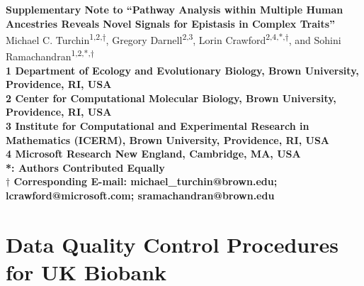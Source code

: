 \documentclass[10pt]{article}
\begin{document}
\begin{flushleft}
{\Large{\textbf{Supplementary Note to ``Pathway Analysis within Multiple Human Ancestries Reveals Novel Signals for Epistasis in Complex Traits''}}}
\newline
\\
Michael C. Turchin\textsuperscript{1,2,$\dagger$}, Gregory Darnell\textsuperscript{2,3}, Lorin Crawford\textsuperscript{2,4,*,$\dagger$}, and Sohini Ramachandran\textsuperscript{1,2,*,$\dagger$} 
\\
\bigskip
\bf{1} Department of Ecology and Evolutionary Biology, Brown University, Providence, RI, USA
\\
\bf{2} Center for Computational Molecular Biology, Brown University, Providence, RI, USA
\\
\bf{3} Institute for Computational and Experimental Research in Mathematics (ICERM), Brown University, Providence, RI, USA
\\
\bf{4} Microsoft Research New England, Cambridge, MA, USA
\\
\bigskip
*: Authors Contributed Equally\\
$\dagger$ Corresponding E-mail: michael\_turchin@brown.edu; lcrawford@microsoft.com; sramachandran@brown.edu 
\end{flushleft}

\setcounter{figure}{0}
\setcounter{table}{0}
\setcounter{equation}{0}
\makeatletter 

\tableofcontents


\clearpage
\newpage

\section{Data Quality Control Procedures for UK Biobank}
\end{document}

